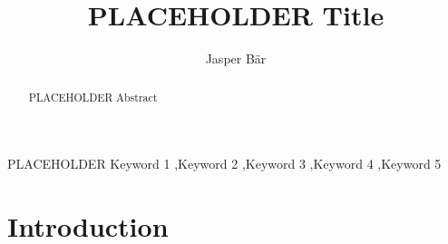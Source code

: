 \documentclass[review]{elsarticle}
\begin{document}
\begin{frontmatter}

\title{PLACEHOLDER Title}

\author {Jasper Bär}


\begin{abstract}
PLACEHOLDER Abstract
\end{abstract}

\begin{keyword}
PLACEHOLDER Keyword 1 \sep Keyword 2 \sep Keyword 3 \sep Keyword 4 \sep Keyword 5
\end{keyword}


\end{frontmatter}

\newpage

\section{Introduction} \label{sec:intro}

\end{document}
